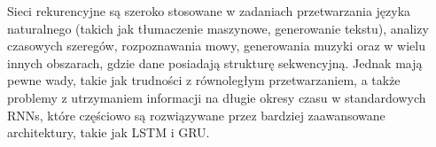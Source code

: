 \documentclass{article}
\begin{document}
Sieci rekurencyjne są szeroko stosowane w zadaniach przetwarzania języka naturalnego (takich jak tłumaczenie maszynowe, generowanie tekstu), analizy czasowych szeregów, rozpoznawania mowy, generowania muzyki oraz w wielu innych obszarach, gdzie dane posiadają strukturę sekwencyjną. Jednak mają pewne wady, takie jak trudności z równoległym przetwarzaniem, a także problemy z utrzymaniem informacji na długie okresy czasu w standardowych RNNs, które częściowo są rozwiązywane przez bardziej zaawansowane architektury, takie jak LSTM i GRU.

\section{}
\end{document}
